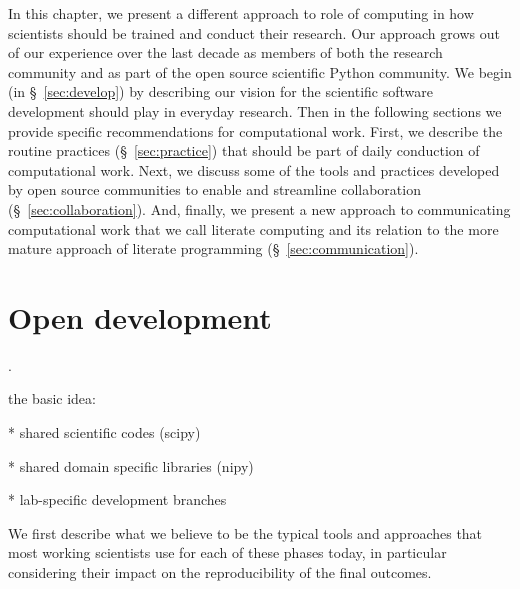 \documentclass[ChapterTOCs,krantz2]{krantz} %
\theoremstyle{definition}
\begin{document}
In this chapter, we present a different approach to role of computing in how
scientists should be trained and conduct their research. Our approach grows out
of our experience over the last decade as members of both the research
community and as part of the open source scientific Python community.  We begin
(in §~\ref{sec:develop}) by describing our vision for the scientific
software development should play in everyday research. Then in the following
sections we provide specific recommendations for computational work. First,
we describe the routine practices (§~\ref{sec:practice}) that should be
part of daily conduction of computational work. Next, we discuss some of
the tools and practices developed by open source communities to enable
and streamline collaboration (§~\ref{sec:collaboration}). And, finally,
we present a new approach to communicating computational work that we call
literate computing and its relation to the more mature approach of literate
programming (§~\ref{sec:communication}).


\section{\label{sec:develop}Open development}

\cite{turk2013scale}.

the basic idea:

* shared scientific codes (scipy)

* shared domain specific libraries (nipy)

* lab-specific development branches

We first describe what we believe to be the typical tools and approaches that
most working scientists use for each of these phases today, in particular
considering their impact on the reproducibility of the final outcomes. 
\end{document}
